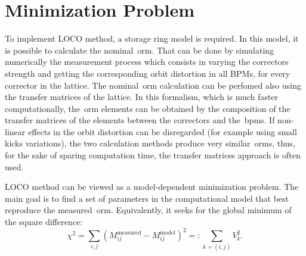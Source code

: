 


\section{Minimization Problem}
To implement LOCO method, a storage ring model is required. In this model, it is possible to calculate the nominal~\gls{orm}. That can be done by simulating numerically the measurement process which consists in varying the correctors strength and getting the corresponding orbit distortion in all BPMs, for every corrector in the lattice. The nominal~\gls{orm} calculation can be perfomed also using the transfer matrices of the lattice. In this formalism, which is much faster computationally, the~\gls{orm} elements can be obtained by the composition of the transfer matrices of the elements between the correctors and the~\gls{bpm}s. If non-linear effects in the orbit distortion can be disregarded (for example using small kicks variations), the two calculation methods produce very similar~\gls{orm}s, thus, for the sake of sparing computation time, the transfer matrices approach is often used.

LOCO method can be viewed as a model-dependent minimization problem. The main goal is to find a set of parameters in the computational model that best reproduce the measured~\gls{orm}. Equivalently, it seeks for the global minimum of the square difference:
\begin{equation}
    \chi^2 = \sum_{i, j} \left(M^{\mathrm{measured}}_{ij} - M^{\mathrm{model}}_{ij}\right)^2 =: \sum_{{k = (i,j)}} V_{k}^2.
    \label{eq:chi2}
\end{equation}

